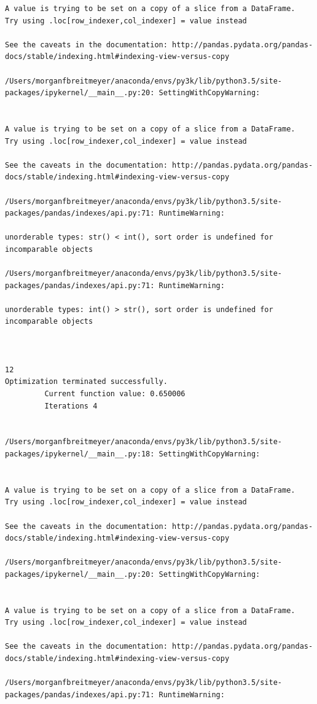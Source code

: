 \begin{lstlisting}
A value is trying to be set on a copy of a slice from a DataFrame.
Try using .loc[row_indexer,col_indexer] = value instead

See the caveats in the documentation: http://pandas.pydata.org/pandas-docs/stable/indexing.html#indexing-view-versus-copy

/Users/morganfbreitmeyer/anaconda/envs/py3k/lib/python3.5/site-packages/ipykernel/__main__.py:20: SettingWithCopyWarning:


A value is trying to be set on a copy of a slice from a DataFrame.
Try using .loc[row_indexer,col_indexer] = value instead

See the caveats in the documentation: http://pandas.pydata.org/pandas-docs/stable/indexing.html#indexing-view-versus-copy

/Users/morganfbreitmeyer/anaconda/envs/py3k/lib/python3.5/site-packages/pandas/indexes/api.py:71: RuntimeWarning:

unorderable types: str() < int(), sort order is undefined for incomparable objects

/Users/morganfbreitmeyer/anaconda/envs/py3k/lib/python3.5/site-packages/pandas/indexes/api.py:71: RuntimeWarning:

unorderable types: int() > str(), sort order is undefined for incomparable objects



12
Optimization terminated successfully.
         Current function value: 0.650006
         Iterations 4


/Users/morganfbreitmeyer/anaconda/envs/py3k/lib/python3.5/site-packages/ipykernel/__main__.py:18: SettingWithCopyWarning:


A value is trying to be set on a copy of a slice from a DataFrame.
Try using .loc[row_indexer,col_indexer] = value instead

See the caveats in the documentation: http://pandas.pydata.org/pandas-docs/stable/indexing.html#indexing-view-versus-copy

/Users/morganfbreitmeyer/anaconda/envs/py3k/lib/python3.5/site-packages/ipykernel/__main__.py:20: SettingWithCopyWarning:


A value is trying to be set on a copy of a slice from a DataFrame.
Try using .loc[row_indexer,col_indexer] = value instead

See the caveats in the documentation: http://pandas.pydata.org/pandas-docs/stable/indexing.html#indexing-view-versus-copy

/Users/morganfbreitmeyer/anaconda/envs/py3k/lib/python3.5/site-packages/pandas/indexes/api.py:71: RuntimeWarning:


\end{lstlisting}
